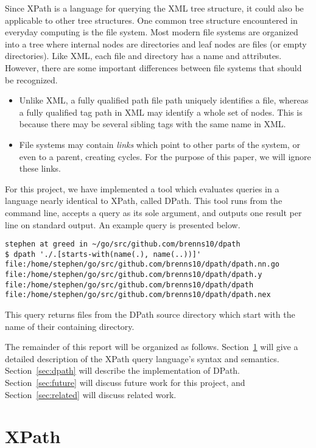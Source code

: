 \documentclass{scrartcl}
\begin{document}
Since XPath is a language for querying the XML tree structure, it could also be
applicable to other tree structures. One common tree structure encountered in
everyday computing is the file system. Most modern file systems are organized
into a tree where internal nodes are directories and leaf nodes are files (or
empty directories). Like XML, each file and directory has a name and attributes.
However, there are some important differences between file systems that should
be recognized.

\begin{itemize}
\item Unlike XML, a fully qualified path file path uniquely identifies a file,
  whereas a fully qualified tag path in XML may identify a whole set of nodes.
  This is because there may be several sibling tags with the same name in XML.
\item File systems may contain \emph{links} which point to other parts of the
  system, or even to a parent, creating cycles. For the purpose of this paper,
  we will ignore these links.
\end{itemize}

For this project, we have implemented a tool which evaluates queries in a
language nearly identical to XPath, called DPath. This tool runs from the
command line, accepts a query as its sole argument, and outputs one result per
line on standard output. An example query is presented below.

\begin{lstlisting}
stephen at greed in ~/go/src/github.com/brenns10/dpath
$ dpath './.[starts-with(name(.), name(..))]'
file:/home/stephen/go/src/github.com/brenns10/dpath/dpath.nn.go
file:/home/stephen/go/src/github.com/brenns10/dpath/dpath.y
file:/home/stephen/go/src/github.com/brenns10/dpath/dpath
file:/home/stephen/go/src/github.com/brenns10/dpath/dpath.nex
\end{lstlisting}

This query returns files from the DPath source directory which start with the
name of their containing directory.

The remainder of this report will be organized as follows.
Section~\ref{sec:xpath} will give a detailed description of the XPath query
language's syntax and semantics. Section~\ref{sec:dpath} will describe the
implementation of DPath. Section~\ref{sec:future} will discuss future work for
this project, and Section~\ref{sec:related} will discuss related work.

\section{XPath}
\label{sec:xpath}
\end{document}
